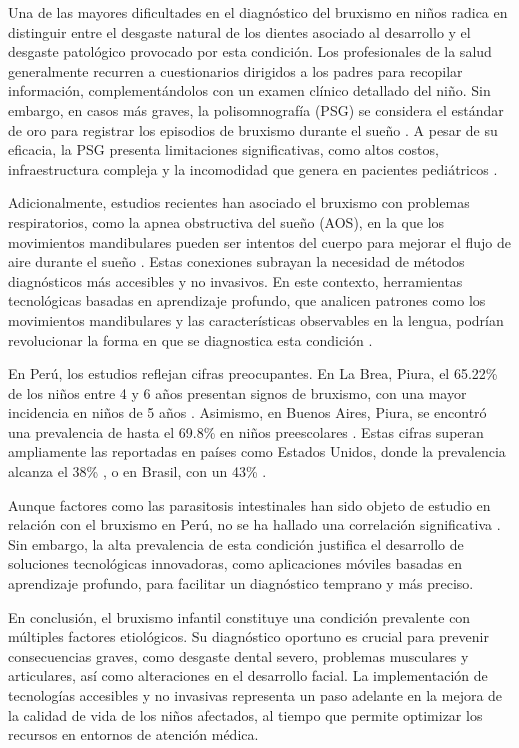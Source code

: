 Una de las mayores dificultades en el diagnóstico del bruxismo en niños radica en distinguir entre el desgaste natural de los dientes asociado al desarrollo y el desgaste patológico provocado por esta condición. Los profesionales de la salud generalmente recurren a cuestionarios dirigidos a los padres para recopilar información, complementándolos con un examen clínico detallado del niño. Sin embargo, en casos más graves, la polisomnografía (PSG) se considera el estándar de oro para registrar los episodios de bruxismo durante el sueño \parencite{Luiz2008, Sandoval2016}. A pesar de su eficacia, la PSG presenta limitaciones significativas, como altos costos, infraestructura compleja y la incomodidad que genera en pacientes pediátricos \parencite{Chisini2020}.

Adicionalmente, estudios recientes han asociado el bruxismo con problemas respiratorios, como la apnea obstructiva del sueño (AOS), en la que los movimientos mandibulares pueden ser intentos del cuerpo para mejorar el flujo de aire durante el sueño \parencite{Bulanda2021, Goettems2017}. Estas conexiones subrayan la necesidad de métodos diagnósticos más accesibles y no invasivos. En este contexto, herramientas tecnológicas basadas en aprendizaje profundo, que analicen patrones como los movimientos mandibulares y las características observables en la lengua, podrían revolucionar la forma en que se diagnostica esta condición \parencite{Chisini2020}.

En Perú, los estudios reflejan cifras preocupantes. En La Brea, Piura, el 65.22\% de los niños entre 4 y 6 años presentan signos de bruxismo, con una mayor incidencia en niños de 5 años \parencite{Baldeon2014}. Asimismo, en Buenos Aires, Piura, se encontró una prevalencia de hasta el 69.8\% en niños preescolares \parencite{Delgado2002}. Estas cifras superan ampliamente las reportadas en países como Estados Unidos, donde la prevalencia alcanza el 38\% \parencite{Cheifetz2005}, o en Brasil, con un 43\% \parencite{Valera2003}.

Aunque factores como las parasitosis intestinales han sido objeto de estudio en relación con el bruxismo en Perú, no se ha hallado una correlación significativa \parencite{Baldeon2014}. Sin embargo, la alta prevalencia de esta condición justifica el desarrollo de soluciones tecnológicas innovadoras, como aplicaciones móviles basadas en aprendizaje profundo, para facilitar un diagnóstico temprano y más preciso.

En conclusión, el bruxismo infantil constituye una condición prevalente con múltiples factores etiológicos. Su diagnóstico oportuno es crucial para prevenir consecuencias graves, como desgaste dental severo, problemas musculares y articulares, así como alteraciones en el desarrollo facial. La implementación de tecnologías accesibles y no invasivas representa un paso adelante en la mejora de la calidad de vida de los niños afectados, al tiempo que permite optimizar los recursos en entornos de atención médica.

